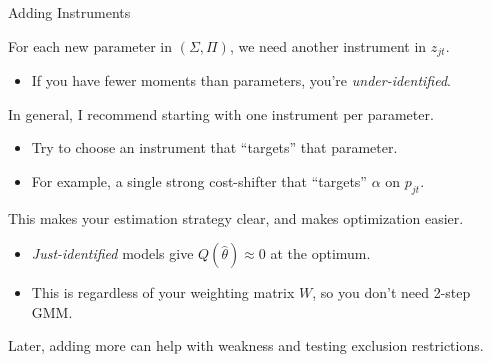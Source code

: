 \documentclass[aspectratio=169,t,11pt,table]{beamer}
\begin{document}
\begin{frame}{Adding Instruments}
    \begin{wideitemize}
        \item For each new parameter in $(\Sigma, \Pi)$, we need another instrument in $z_{jt}$.
        \begin{itemize}
            \item If you have fewer moments than parameters, you're \textit{under-identified}.
        \end{itemize}
        \pause
        \item In general, I recommend starting with one instrument per parameter.
        \begin{itemize}
            \item Try to choose an instrument that ``targets'' that parameter.
            \item For example, a single strong cost-shifter that ``targets'' $\alpha$ on $p_{jt}$.
        \end{itemize}
        \pause
        \item This makes your estimation strategy clear, and makes optimization easier.
        \begin{itemize}
            \item \textit{Just-identified} models give $Q(\hat{\theta}) \approx 0$ at the optimum.
            \item This is regardless of your weighting matrix $W$, so you don't need 2-step GMM.
        \end{itemize}
        \pause
        \item Later, adding more can help with weakness and testing exclusion restrictions. 
    \end{wideitemize}
\end{frame}
\end{document}
